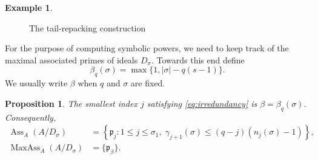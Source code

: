 \documentclass[11pt,reqno]{amsart}
\numberwithin{equation}{subsection}
\newtheorem{proposition}[theorem]{Proposition}
\theoremstyle{definition}
\newtheorem{example}[theorem]{Example}
\theoremstyle{remark}
\DeclareMathOperator{\Ass}{Ass}
\DeclareMathOperator{\MaxAss}{MaxAss}
\newcommand{\fp}{\mathfrak p}
\begin{document}
\begin{example}
\begin{figure}[h!]

    \caption{The tail-repacking construction}
    \label{fig:tail-repacking}
\end{figure}
\end{example}


For the purpose of computing symbolic powers, we need to keep track of the maximal associated primes of ideals $D_\sigma$. Towards this end define
\begin{equation}\label{eq:beta-def}
 \beta_q(\sigma)=\max\{1,|\sigma|-q(s-1)\}.
\end{equation}
We usually write $\beta$ when $q$ and $\sigma$ are fixed.

\begin{proposition}\label{prop:max-ass}
The smallest index $j$ satisfying \eqref{eq:irredundancy} is
$\beta=\beta_q(\sigma)$.  Consequently,
\begin{align}
 \Ass_A(A/D_\sigma)
 &=\left\{\fp_j:1\le j\le\sigma_1,\;
 \gamma_{j+1}(\sigma)
 \le(q-j)(n_j(\sigma)-1)\right\},\label{eq:ass-set}\\
 \MaxAss_A(A/D_\sigma)&=\{\fp_\beta\}.\label{eq:maxass}
\end{align}
\end{proposition}
\end{document}
